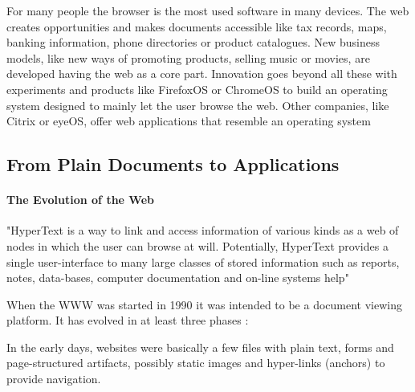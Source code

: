 For many people the browser is the most used software in many devices. 
The web creates opportunities and makes documents accessible like tax records, maps, banking information, phone directories or product catalogues.
New business models, like new ways of promoting products, selling music or movies, are developed having the web as a core part.
Innovation goes beyond all these with experiments and products like FirefoxOS or ChromeOS to build an operating system designed to mainly let the user browse the web. 
Other companies, like Citrix or eyeOS, offer web applications that resemble an operating system %


%
%

\subsection{From Plain Documents to Applications}
\paragraph{The Evolution of the Web}
"HyperText is a way to link and access information of various kinds as a web of nodes in which the user can browse at will. Potentially, HyperText provides a single user-interface to many large classes of stored information such as reports, notes, data-bases, computer documentation and on-line systems help" \cite{BernersLee:1990}

When the \ac{WWW} was started in 1990 it was intended to be a document viewing platform.
It has evolved in at least three phases \cite{Anttonen:2011} \cite{Taivalsaari:2008}:

In the early days, websites were basically a few files with plain text, forms and page-structured artifacts, possibly static images and hyper-links (anchors) to provide navigation. 

